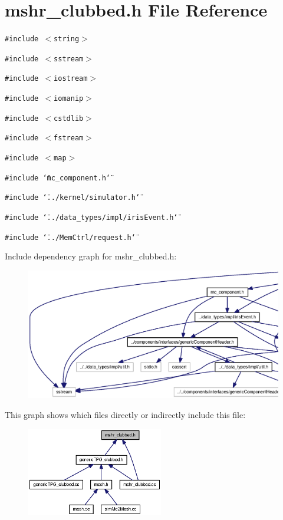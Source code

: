 \section{mshr\_\-clubbed.h File Reference}
\label{mshr__clubbed_8h}
{\tt \#include $<$string$>$}\par
{\tt \#include $<$sstream$>$}\par
{\tt \#include $<$iostream$>$}\par
{\tt \#include $<$iomanip$>$}\par
{\tt \#include $<$cstdlib$>$}\par
{\tt \#include $<$fstream$>$}\par
{\tt \#include $<$map$>$}\par
{\tt \#include \char`\"{}mc\_\-component.h\char`\"{}}\par
{\tt \#include \char`\"{}../kernel/simulator.h\char`\"{}}\par
{\tt \#include \char`\"{}../data\_\-types/impl/irisEvent.h\char`\"{}}\par
{\tt \#include \char`\"{}../MemCtrl/request.h\char`\"{}}\par


Include dependency graph for mshr\_\-clubbed.h:\nopagebreak
\begin{figure}[H]
\begin{center}
\leavevmode
\includegraphics[width=420pt]{mshr__clubbed_8h__incl}
\end{center}
\end{figure}


This graph shows which files directly or indirectly include this file:\nopagebreak
\begin{figure}[H]
\begin{center}
\leavevmode
\includegraphics[width=169pt]{mshr__clubbed_8h__dep__incl}
\end{center}
\end{figure}

